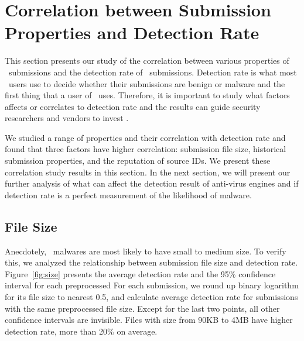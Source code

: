 \section{Correlation between Submission Properties and Detection Rate}
\label{sec:corr}
This section presents our study of the correlation between various properties of \pe\ submissions and the detection rate of \pe\ submissions.
Detection rate is what most \vt\ users use to decide whether their submissions are benign or malware 
and the first thing that a user of \vt\ uses.
Therefore, it is important to study what factors affects or correlates to detection rate
and the results can guide security researchers and vendors to invest . 

We studied a range of properties and their correlation with detection rate
and found that three factors have higher correlation:
submission file size,
historical submission properties, and the reputation of source IDs.
We present these correlation study results in this section.
In the next section, we will present our further analysis of what can affect the detection result of anti-virus engines
and if detection rate is a perfect measurement of the likelihood of malware.

%



\subsection{File Size}
\label{sec:size}
Anecdotely, \pe\ malwares are most likely to have small to medium size. 
To verify this, we analyzed the relationship between submission file size and detection rate. 
Figure~\ref{fig:size} presents the average detection rate and 
the 95\% confidence interval for each preprocessed 
For each submission, we round up binary logarithm for its file size to nearest 0.5,
and calculate average detection rate for submissions with the same preprocessed file size.
Except for the last two points, all other confidence intervals are invisible.   
Files with size from 90KB to 4MB have higher detection rate, more than 20\% on average. 

